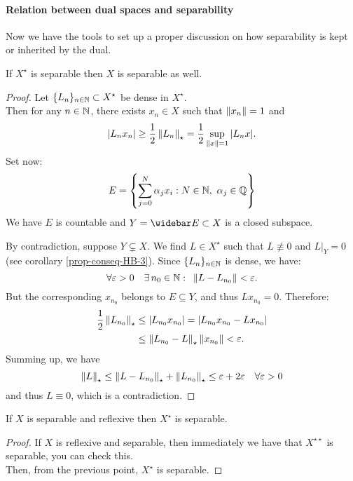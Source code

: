 \paragraph{Relation between dual spaces and separability} Now we have the tools to set up a proper discussion on how separability is kept or inherited by the dual.

\begin{theo}
	If $X^\star$ is separable then $X$ is separable as well.
\end{theo}

\begin{proof}
	Let $\{L_n\}_{n\in\mathbb N}\subset X^\star$ be dense in $X^\star$.\\
	Then for any $n \in \mathbb N$, there exists $x_n \in X$ such that $\left\lVert x_n\right\rVert=1$ and
	$$|L_n x_n| \geq \frac 1 2 \left\lVert L_n\right\rVert_{\star}
	= \frac 1 2 \sup_{\left\lVert x\right\rVert = 1} |L_n x|.$$
	Set now:
	$$E = \left\{ \sum_{j=0}^{N} \alpha_j x_i : N \in \mathbb N, \ \alpha_j \in \mathbb Q \right\}$$
	We have $E$ is countable and $Y=\widebar E\subset X$ is a closed subspace.
	
	By contradiction, suppose $Y \subsetneq X$. We find $L \in X^\star$ such that $L\not\equiv 0$ and $L|_Y =0$ (see corollary \vref{prop-conseq-HB-3}). Since $\{L_n\}_{n\in\mathbb N}$ is dense, we have:
	$$\forall \varepsilon > 0 \quad \exists\, n_0 \in \mathbb N : \enspace \left\lVert L-L_{n_0}\right\rVert < \varepsilon.$$
	But the corresponding $x_{n_0}$ belongs to $E \subseteq Y$, and thus $Lx_{n_0} = 0$. Therefore:
	\begin{align*}
		\frac 1 2 \left\lVert L_{n_0}\right\rVert_\star &\leq |L_{n_0}x_{n_0}|= |L_{n_0}x_{n_0}-Lx_{n_0}|\\
		&\leq \left\lVert L_{n_0}-L\right\rVert_\star\left\lVert x_{n_0}\right\rVert < \varepsilon.
	\end{align*}
	Summing up, we have
	$$\left\lVert L\right\rVert_{\star} \leq \left\lVert L-L_{n_0}\right\rVert_\star + \left\lVert L_{n_0}\right\rVert_\star \leq \varepsilon + 2 \varepsilon \quad \forall \varepsilon > 0$$
	and thus $L \equiv 0$, which is a contradiction.
\end{proof}

\begin{theo}\label{x-sep-ref-then-x-star-sep}
	If $X$ is separable and reflexive then $X^\star$ is separable.
\end{theo}

\begin{proof}
	If $X$ is reflexive and separable, then immediately we have that $X^{\star\star}$ is separable, you can check this.\\
	Then, from the previous point, $X^\star$ is separable.
\end{proof}



